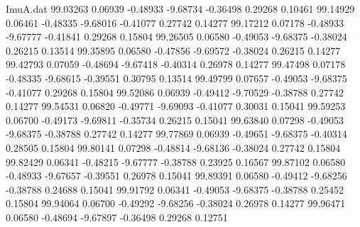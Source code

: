 \begin{filecontents}{ImuA.dat}
  99.03263    0.06939   -0.48933   -9.68734   -0.36498    0.29268    0.10461
  99.14929    0.06461   -0.48335   -9.68016   -0.41077    0.27742    0.14277
  99.17212    0.07178   -0.48933   -9.67777   -0.41841    0.29268    0.15804
  99.26505    0.06580   -0.49053   -9.68375   -0.38024    0.26215    0.13514
  99.35895    0.06580   -0.47856   -9.69572   -0.38024    0.26215    0.14277
  99.42793    0.07059   -0.48694   -9.67418   -0.40314    0.26978    0.14277
  99.47498    0.07178   -0.48335   -9.68615   -0.39551    0.30795    0.13514
  99.49799    0.07657   -0.49053   -9.68375   -0.41077    0.29268    0.15804
  99.52086    0.06939   -0.49412   -9.70529   -0.38788    0.27742    0.14277
  99.54531    0.06820   -0.49771   -9.69093   -0.41077    0.30031    0.15041
  99.59253    0.06700   -0.49173   -9.69811   -0.35734    0.26215    0.15041
  99.63840    0.07298   -0.49053   -9.68375   -0.38788    0.27742    0.14277
  99.77869    0.06939   -0.49651   -9.68375   -0.40314    0.28505    0.15804
  99.80141    0.07298   -0.48814   -9.68136   -0.38024    0.27742    0.15804
  99.82429    0.06341   -0.48215   -9.67777   -0.38788    0.23925    0.16567
  99.87102    0.06580   -0.48933   -9.67657   -0.39551    0.26978    0.15041
  99.89391    0.06580   -0.49412   -9.68256   -0.38788    0.24688    0.15041
  99.91792    0.06341   -0.49053   -9.68375   -0.38788    0.25452    0.15804
  99.94064    0.06700   -0.49292   -9.68256   -0.38024    0.26978    0.14277
  99.96471    0.06580   -0.48694   -9.67897   -0.36498    0.29268    0.12751
\end{filecontents}
